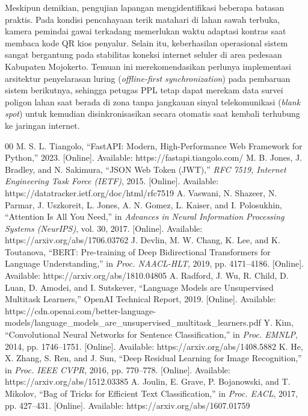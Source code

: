 ﻿\documentclass[conference]{IEEEtran}
\begin{document}
Meskipun demikian, pengujian lapangan mengidentifikasi beberapa batasan praktis. Pada kondisi pencahayaan terik matahari di lahan sawah terbuka, kamera pemindai gawai terkadang memerlukan waktu adaptasi kontras saat membaca kode QR kios penyalur. Selain itu, keberhasilan operasional sistem sangat bergantung pada stabilitas koneksi internet seluler di area pedesaan Kabupaten Mojokerto. Temuan ini merekomendasikan perlunya implementasi arsitektur penyelarasan luring (\textit{offline-first synchronization}) pada pembaruan sistem berikutnya, sehingga petugas PPL tetap dapat merekam data survei poligon lahan saat berada di zona tanpa jangkauan sinyal telekomunikasi (\textit{blank spot}) untuk kemudian disinkronisasikan secara otomatis saat kembali terhubung ke jaringan internet.

\begin{thebibliography}{00}
 M. S. L. Tiangolo, ``FastAPI: Modern, High-Performance Web Framework for Python,'' 2023. [Online]. Available: https://fastapi.tiangolo.com/
 M. B. Jones, J. Bradley, and N. Sakimura, ``JSON Web Token (JWT),'' \textit{RFC 7519, Internet Engineering Task Force (IETF)}, 2015. [Online]. Available: https://datatracker.ietf.org/doc/html/rfc7519
 A. Vaswani, N. Shazeer, N. Parmar, J. Uszkoreit, L. Jones, A. N. Gomez, L. Kaiser, and I. Polosukhin, ``Attention Is All You Need,'' in \textit{Advances in Neural Information Processing Systems (NeurIPS)}, vol. 30, 2017. [Online]. Available: https://arxiv.org/abs/1706.03762
 J. Devlin, M. W. Chang, K. Lee, and K. Toutanova, ``BERT: Pre-training of Deep Bidirectional Transformers for Language Understanding,'' in \textit{Proc. NAACL-HLT}, 2019, pp. 4171--4186. [Online]. Available: https://arxiv.org/abs/1810.04805
 A. Radford, J. Wu, R. Child, D. Luan, D. Amodei, and I. Sutskever, ``Language Models are Unsupervised Multitask Learners,'' OpenAI Technical Report, 2019. [Online]. Available: https://cdn.openai.com/better-language-models/language\_models\_are\_unsupervised\_multitask\_learners.pdf
 Y. Kim, ``Convolutional Neural Networks for Sentence Classification,'' in \textit{Proc. EMNLP}, 2014, pp. 1746--1751. [Online]. Available: https://arxiv.org/abs/1408.5882
 K. He, X. Zhang, S. Ren, and J. Sun, ``Deep Residual Learning for Image Recognition,'' in \textit{Proc. IEEE CVPR}, 2016, pp. 770--778. [Online]. Available: https://arxiv.org/abs/1512.03385
 A. Joulin, E. Grave, P. Bojanowski, and T. Mikolov, ``Bag of Tricks for Efficient Text Classification,'' in \textit{Proc. EACL}, 2017, pp. 427--431. [Online]. Available: https://arxiv.org/abs/1607.01759

\end{thebibliography}
\end{document}
